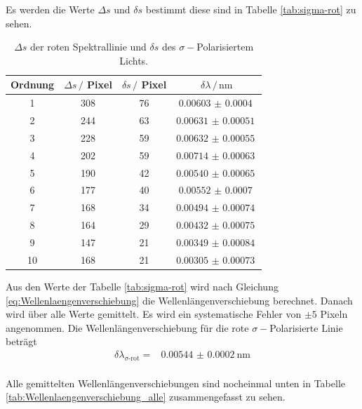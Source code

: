 Es werden die Werte $\Delta s$ und $\delta s$ bestimmt diese sind in Tabelle \autoref{tab:sigma-rot} zu sehen.

\begin{table}
    \centering
    \caption{$\Delta s$ der roten Spektrallinie und $\delta s$ des $\sigma -$Polarisiertem Lichts.}
    \begin{tabular}{cccc}
        \toprule
        Ordnung & $\Delta s \, /$ Pixel & $\delta s \, /$ Pixel & $\delta \lambda \, / \, \si{\nano\meter}$ \\
        \midrule
        1   &   308  &    76 & $\SI{0.00603(40)}{}$   \\
        2   &   244  &    63 & $\SI{0.00631(51)}{}$   \\
        3   &   228  &    59 & $\SI{0.00632(55)}{}$   \\
        4   &   202  &    59 & $\SI{0.00714(63)}{}$   \\
        5   &   190  &    42 & $\SI{0.00540(65)}{}$   \\
        6   &   177  &    40 & $\SI{0.00552(70)}{}$   \\
        7   &   168  &    34 & $\SI{0.00494(74)}{}$   \\
        8   &   164  &    29 & $\SI{0.00432(75)}{}$   \\
        9   &   147  &    21 & $\SI{0.00349(84)}{}$   \\
        10  &   168  &    21 & $\SI{0.00305(73)}{}$   \\
        \bottomrule
    \end{tabular}
    \label{tab:sigma-rot}
\end{table}

Aus den Werte der Tabelle \autoref{tab:sigma-rot} wird nach Gleichung \eqref{eq:Wellenlaengenverschiebung} die Wellenlängenverschiebung berechnet.
Danach wird über alle Werte gemittelt.
Es wird ein systematische Fehler von $\pm 5$ Pixeln angenommen.
Die Wellenlängenverschiebung für die rote $\sigma -$Polarisierte Linie beträgt
\begin{align*}
    \delta \lambda _\text{$\sigma$-rot} =&  \SI{0.00544(020)}{\nano\meter} \\
\end{align*}

Alle gemittelten Wellenlängenverschiebungen sind nocheinmal unten in Tabelle \autoref{tab:Wellenlaengenverschiebung_alle} zusammengefasst zu sehen.

